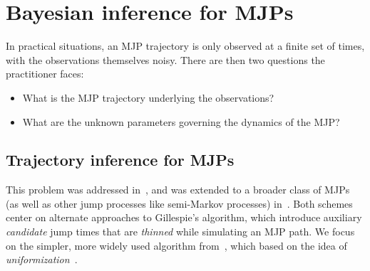 \section{Bayesian inference for MJPs}
In practical situations, an MJP trajectory is only observed at
a finite set of times, with the observations themselves
noisy. There are then two questions the practitioner faces:
\begin{itemize}
  \item What is the MJP trajectory underlying the observations?
  \item What are the unknown parameters governing the dynamics of the MJP?
\end{itemize}

\subsection{Trajectory inference for MJPs}
This problem was addressed in~\cite{RaoTeh13}, and was extended to a broader class of 
MJPs (as well as other jump processes like semi-Markov processes) 
in~\cite{RaoTeh12}. Both schemes center on alternate approaches to 
Gillespie's algorithm, which introduce auxiliary {\em candidate} jump times 
that are {\em thinned} while simulating an MJP path.  We focus on 
the simpler, more widely used {\algname} algorithm from~\cite{RaoTeh13},
which based on the idea of {\em uniformization}~\cite{Jen1953}. 


